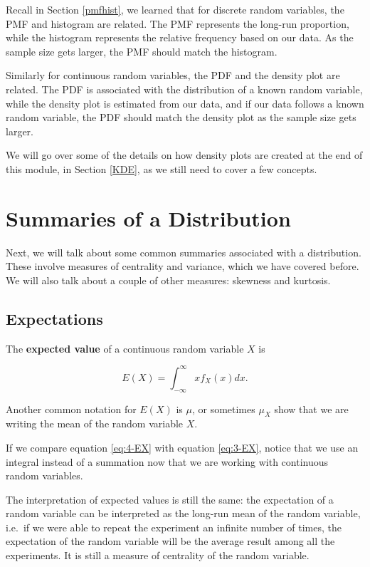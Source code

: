 \documentclass[
]{book}
\begin{document}
Recall in Section \ref{pmfhist}, we learned that for discrete random variables, the PMF and histogram are related. The PMF represents the long-run proportion, while the histogram represents the relative frequency based on our data. As the sample size gets larger, the PMF should match the histogram.

Similarly for continuous random variables, the PDF and the density plot are related. The PDF is associated with the distribution of a known random variable, while the density plot is estimated from our data, and if our data follows a known random variable, the PDF should match the density plot as the sample size gets larger.

We will go over some of the details on how density plots are created at the end of this module, in Section \ref{KDE}, as we still need to cover a few concepts.

\hypertarget{summsDist}{%
\section{Summaries of a Distribution}\label{summsDist}}

Next, we will talk about some common summaries associated with a distribution. These involve measures of centrality and variance, which we have covered before. We will also talk about a couple of other measures: skewness and kurtosis.

\hypertarget{expectations-1}{%
\subsection{Expectations}\label{expectations-1}}

The \textbf{expected value} of a continuous random variable \(X\) is

\begin{equation} 
E(X) = \int_{-\infty}^{\infty} x f_X(x) dx.
\label{eq:4-EX}
\end{equation}

Another common notation for \(E(X)\) is \(\mu\), or sometimes \(\mu_X\) show that we are writing the mean of the random variable \(X\).

If we compare equation \eqref{eq:4-EX} with equation \eqref{eq:3-EX}, notice that we use an integral instead of a summation now that we are working with continuous random variables.

The interpretation of expected values is still the same: the expectation of a random variable can be interpreted as the long-run mean of the random variable, i.e.~if we were able to repeat the experiment an infinite number of times, the expectation of the random variable will be the average result among all the experiments. It is still a measure of centrality of the random variable.
\end{document}
